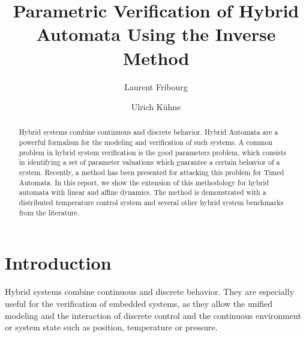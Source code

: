 \documentclass{llncs}
\begin{document}
\pagestyle{plain}

\title{Parametric Verification of Hybrid Automata Using the Inverse Method}

\author{Laurent Fribourg \and Ulrich K\"uhne}




\maketitle

\begin{abstract}
  Hybrid systems combine continuous and discrete behavior.  Hybrid
  Automata are a powerful formalism for the modeling and verification
  of such systems. A common problem in hybrid system verification is
  the good parameters problem, which consists in identifying a set
  of parameter valuations which guarantee a certain behavior of a
  system. Recently, a method has been presented for attacking this
  problem for Timed Automata. In this report, we show the extension of
  this methodology for hybrid automata with linear and affine
  dynamics. The method is demonstrated with a distributed temperature
  control system and several other hybrid system benchmarks from the
  literature.
\end{abstract}


\section{Introduction} \label{sec:intro}

Hybrid systems combine continuous and discrete behavior. They are
especially useful for the verification of embedded systems, as they
allow the unified modeling and the interaction of discrete control and
the continuous environment or system state such as position,
temperature or pressure. 
\end{document}
